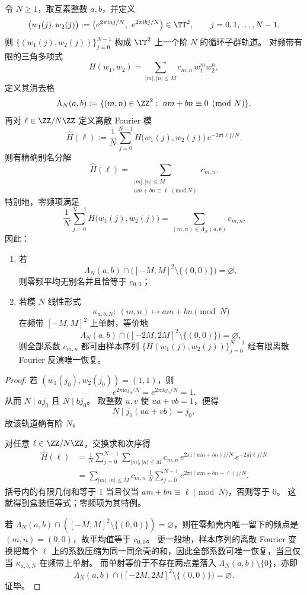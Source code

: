 \begin{proposition}\label{prop:xi-lissajous-cyclic-orbit-alias-lattice}
令 \(N\ge 1\)，取互素整数 \(a,b\)，并定义
\[
\bigl(w_1(j),w_2(j)\bigr)
:=
\bigl(e^{2\pi \mathrm{i}aj/N},\ e^{2\pi \mathrm{i}bj/N}\bigr)
\in\TT^2,
\qquad j=0,1,\dots,N-1.
\]
则 \(\{(w_1(j),w_2(j))\}_{j=0}^{N-1}\) 构成 \(\TT^2\) 上一个阶 \(N\) 的循环子群轨道。
对频带有限的三角多项式
\[
H(w_1,w_2)
=
\sum_{|m|,|n|\le M}c_{m,n}\,w_1^m w_2^n,
\]
定义其消去格
\[
\Lambda_N(a,b):=
\{(m,n)\in\ZZ^2:\ am+bn\equiv 0\pmod N\}.
\]
再对 \(\ell\in\ZZ/N\ZZ\) 定义离散 Fourier 模
\[
\widehat H(\ell)
:=
\frac1N\sum_{j=0}^{N-1}
H\!\bigl(w_1(j),w_2(j)\bigr)\,
e^{-2\pi \mathrm{i}\ell j/N}.
\]
则有精确别名分解
\[
\boxed{\;
\widehat H(\ell)
=
\sum_{\substack{|m|,|n|\le M\\ am+bn\equiv \ell\;(\mathrm{mod}\,N)}}
c_{m,n}.\;}
\]
特别地，零频项满足
\[
\boxed{\;
\frac1N\sum_{j=0}^{N-1}H\!\bigl(w_1(j),w_2(j)\bigr)
=
\sum_{(m,n)\in\Lambda_N(a,b)}c_{m,n}.\;}
\]
因此：
\begin{enumerate}
  \item 若
  \[
  \Lambda_N(a,b)\cap\bigl([-M,M]^2\setminus\{(0,0)\}\bigr)=\varnothing,
  \]
  则零频平均无别名并且恰等于 \(c_{0,0}\)；
  \item 若模 \(N\) 线性形式
  \[
  \kappa_{a,b,N}:\ (m,n)\longmapsto am+bn\pmod N
  \]
  在频带 \([-M,M]^2\) 上单射，等价地
  \[
  \Lambda_N(a,b)\cap\bigl([-2M,2M]^2\setminus\{(0,0)\}\bigr)=\varnothing,
  \]
  则全部系数 \(c_{m,n}\) 都可由样本序列
  \(\{H(w_1(j),w_2(j))\}_{j=0}^{N-1}\)
  经有限离散 Fourier 反演唯一恢复。
\end{enumerate}
\end{proposition}
\begin{proof}
若 \((w_1(j_0),w_2(j_0))=(1,1)\)，则
\[
e^{2\pi \mathrm{i}a j_0/N}=e^{2\pi \mathrm{i}b j_0/N}=1.
\]
从而 \(N\mid a j_0\) 且 \(N\mid b j_0\)。
取整数 \(u,v\) 使 \(ua+vb=1\)，便得
\[
N\mid j_0(ua+vb)=j_0,
\]
故该轨道确有阶 \(N\)。
\par
对任意 \(\ell\in\ZZ/N\ZZ\)，交换求和次序得
\[
\begin{aligned}
\widehat H(\ell)
&=
\frac1N\sum_{j=0}^{N-1}
\sum_{|m|,|n|\le M}
c_{m,n}\,
e^{2\pi \mathrm{i}(am+bn)j/N}\,
e^{-2\pi \mathrm{i}\ell j/N}\\
&=
\sum_{|m|,|n|\le M}c_{m,n}\,
\frac1N\sum_{j=0}^{N-1}
e^{2\pi \mathrm{i}(am+bn-\ell)j/N}.
\end{aligned}
\]
括号内的有限几何和等于 \(1\) 当且仅当 \(am+bn\equiv \ell\pmod N\)，否则等于 \(0\)。
这就得到盒装恒等式；零频项为其特例。
\par
若 \(\Lambda_N(a,b)\cap([-M,M]^2\setminus\{(0,0)\})=\varnothing\)，则在零频壳内唯一留下的频点是 \((m,n)=(0,0)\)，故平均值等于 \(c_{0,0}\)。
更一般地，样本序列的离散 Fourier 变换把每个 \(\ell\) 上的系数压缩为同一同余壳的和，因此全部系数可唯一恢复，当且仅当 \(\kappa_{a,b,N}\) 在频带上单射。
而单射等价于不存在两点差落入 \(\Lambda_N(a,b)\setminus\{0\}\)，亦即
\[
\Lambda_N(a,b)\cap\bigl([-2M,2M]^2\setminus\{(0,0)\}\bigr)=\varnothing.
\]
证毕。
\end{proof}

